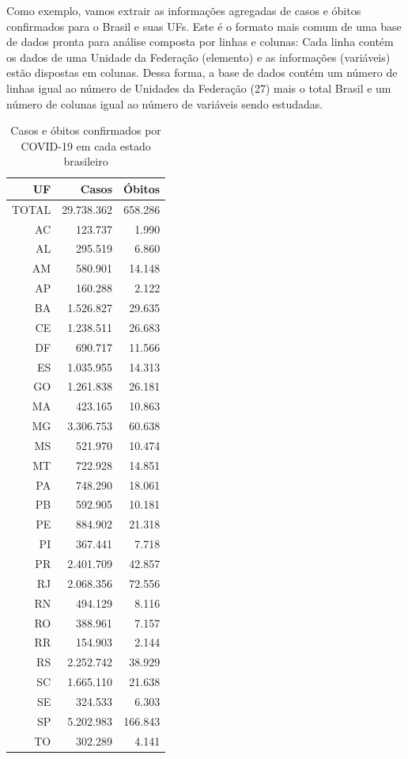 \documentclass[
]{book}
\begin{document}
Como exemplo, vamos extrair as informações agregadas de casos e óbitos confirmados para o Brasil e suas UFs. Este é o formato mais comum de uma base de dados pronta para análise composta por linhas e colunas: Cada linha contém os dados de uma Unidade da Federação (elemento) e as informações (variáveis) estão dispostas em colunas. Dessa forma, a base de dados contém um número de linhas igual ao número de Unidades da Federação (27) mais o total Brasil e um número de colunas igual ao número de variáveis sendo estudadas.

\begin{table}

\caption{\label{tab:unnamed-chunk-5}Casos e óbitos confirmados por COVID-19 em cada estado brasileiro}
\centering
\begin{tabular}[t]{r|r|r}
\hline
UF & Casos & Óbitos\\
\hline
TOTAL & 29.738.362 & 658.286\\
\hline
AC & 123.737 & 1.990\\
\hline
AL & 295.519 & 6.860\\
\hline
AM & 580.901 & 14.148\\
\hline
AP & 160.288 & 2.122\\
\hline
BA & 1.526.827 & 29.635\\
\hline
CE & 1.238.511 & 26.683\\
\hline
DF & 690.717 & 11.566\\
\hline
ES & 1.035.955 & 14.313\\
\hline
GO & 1.261.838 & 26.181\\
\hline
MA & 423.165 & 10.863\\
\hline
MG & 3.306.753 & 60.638\\
\hline
MS & 521.970 & 10.474\\
\hline
MT & 722.928 & 14.851\\
\hline
PA & 748.290 & 18.061\\
\hline
PB & 592.905 & 10.181\\
\hline
PE & 884.902 & 21.318\\
\hline
PI & 367.441 & 7.718\\
\hline
PR & 2.401.709 & 42.857\\
\hline
RJ & 2.068.356 & 72.556\\
\hline
RN & 494.129 & 8.116\\
\hline
RO & 388.961 & 7.157\\
\hline
RR & 154.903 & 2.144\\
\hline
RS & 2.252.742 & 38.929\\
\hline
SC & 1.665.110 & 21.638\\
\hline
SE & 324.533 & 6.303\\
\hline
SP & 5.202.983 & 166.843\\
\hline
TO & 302.289 & 4.141\\
\hline
\end{tabular}
\end{table}
\end{document}
